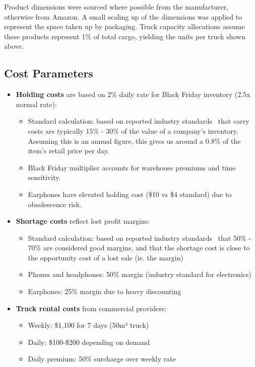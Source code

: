 \documentclass[a4paper,12pt]{article}
\begin{document}
Product dimensions were sourced where possible from the manufacturer, otherwise from Amazon.
A small scaling up of the dimensions was applied to represent the space taken up by packaging.
Truck capacity allocations assume these products represent 1\% of total cargo, yielding the units per truck shown above.

\subsection{Cost Parameters}\label{subsec:cost-parameters}

\begin{itemize}
    \item \textbf{Holding costs} are based on 2\% daily rate for Black Friday inventory (2.5x normal rate):
    \begin{itemize}
        \item Standard calculation: based on reported industry standards~\cite{holdingcosts} that carry costs are typically 15\% - 30\% of the value of a company's inventory.
        Assuming this is an annual figure, this gives us around a 0.8\% of the item's retail price per day.
        \item Black Friday multiplier accounts for warehouse premiums and time sensitivity.
        \item Earphones have elevated holding cost (\$10 vs \$4 standard) due to obsolescence risk.
    \end{itemize}

    \item \textbf{Shortage costs} reflect lost profit margins:
    \begin{itemize}
        \item Standard calculation: based on reported industry standards~\cite{shortagecosts} that 50\% - 70\% are considered good margins, and that the shortage cost is close to the opportunity cost of a lost sale (ie. the margin)
        \item Phones and headphones: 50\% margin (industry standard for electronics)
        \item Earphones: 25\% margin due to heavy discounting
    \end{itemize}

    \item \textbf{Truck rental costs} from commercial providers:
    \begin{itemize}
        \item Weekly: \$1,100 for 7 days (50m³ truck)~\cite{truckcosts1,truckcosts2}~
        \item Daily: \$100-\$200 depending on demand
        \item Daily premium: 50\% surcharge over weekly rate
    \end{itemize}
\end{itemize}
\end{document}

